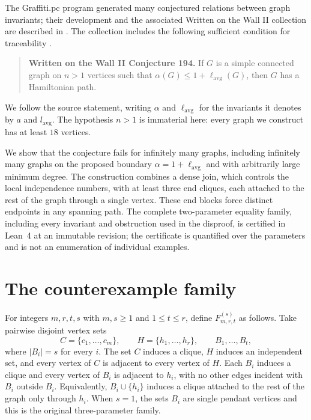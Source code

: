 \documentclass[11pt]{article}
\newcommand{\lavg}{\ell_{\mathrm{avg}}}
\begin{document}
The Graffiti.pc program generated many conjectured relations between graph invariants;
their development and the associated Written on the Wall II collection are described in
\cite{delavina2005history,delavina2007independence}.  The collection includes the following
sufficient condition for traceability \cite{delavinaWOWII}.

\begin{quote}
\textbf{Written on the Wall II Conjecture 194.}
If $G$ is a simple connected graph on $n>1$ vertices such that
$\alpha(G)\leq 1+\lavg(G)$, then $G$ has a Hamiltonian path.
\end{quote}

\noindent
We follow the source statement, writing $\alpha$ and $\lavg$ for the invariants it denotes
by $a$ and $l_{\mathrm{avg}}$.  The hypothesis $n>1$ is immaterial here: every graph we
construct has at least $18$ vertices.

We show that the conjecture fails for infinitely many graphs, including infinitely many
graphs on the proposed boundary $\alpha=1+\lavg$ and with arbitrarily large minimum degree.
The construction combines a dense join, which controls the local independence numbers, with
at least three end cliques, each attached to the rest of the graph through a single vertex.
These end blocks force distinct endpoints in any spanning path.  The complete two-parameter
equality family, including every invariant and obstruction used in the disproof, is certified
in Lean~4 at an immutable revision; the certificate is quantified over the parameters and is
not an enumeration of individual examples.

\section{The counterexample family}

For integers $m,r,t,s$ with $m,s\geq 1$ and $1\leq t\leq r$, define
$F^{(s)}_{m,r,t}$ as follows.  Take pairwise disjoint vertex sets
\[
  C=\{c_1,\dots,c_m\},\qquad
  H=\{h_1,\dots,h_r\},\qquad
  B_1,\dots,B_t,
\]
where $|B_i|=s$ for every $i$.
The set $C$ induces a clique, $H$ induces an independent set, and every vertex of $C$ is
adjacent to every vertex of $H$.  Each $B_i$ induces a clique and every vertex of $B_i$
is adjacent to $h_i$, with no other edges incident with $B_i$ outside $B_i$.  Equivalently,
$B_i\cup\{h_i\}$ induces a clique attached to the rest of the graph only through $h_i$.
When $s=1$, the sets $B_i$ are single pendant vertices and this is the original
three-parameter family.
\end{document}
